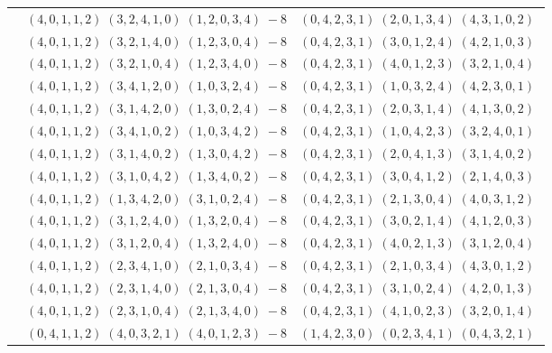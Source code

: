 \documentclass[11pt]{article}
\begin{document}
\begin{longtable}[l]{|c|c|c|}
 \cline{2-3} 
 & $(4 ,0 ,1 ,1 ,2) \;(3 ,2 ,4 ,1 ,0) \;(1 ,2 ,0 ,3 ,4) \;-8$ & $(0 ,4 ,2 ,3 ,1) \;(2 ,0 ,1 ,3 ,4) \;(4 ,3 ,1 ,0 ,2) \;$\\ 
 \cline{2-3} 
 & $(4 ,0 ,1 ,1 ,2) \;(3 ,2 ,1 ,4 ,0) \;(1 ,2 ,3 ,0 ,4) \;-8$ & $(0 ,4 ,2 ,3 ,1) \;(3 ,0 ,1 ,2 ,4) \;(4 ,2 ,1 ,0 ,3) \;$\\ 
 \cline{2-3} 
 & $(4 ,0 ,1 ,1 ,2) \;(3 ,2 ,1 ,0 ,4) \;(1 ,2 ,3 ,4 ,0) \;-8$ & $(0 ,4 ,2 ,3 ,1) \;(4 ,0 ,1 ,2 ,3) \;(3 ,2 ,1 ,0 ,4) \;$\\ 
 \cline{2-3} 
 & $(4 ,0 ,1 ,1 ,2) \;(3 ,4 ,1 ,2 ,0) \;(1 ,0 ,3 ,2 ,4) \;-8$ & $(0 ,4 ,2 ,3 ,1) \;(1 ,0 ,3 ,2 ,4) \;(4 ,2 ,3 ,0 ,1) \;$\\ 
 \cline{2-3} 
 & $(4 ,0 ,1 ,1 ,2) \;(3 ,1 ,4 ,2 ,0) \;(1 ,3 ,0 ,2 ,4) \;-8$ & $(0 ,4 ,2 ,3 ,1) \;(2 ,0 ,3 ,1 ,4) \;(4 ,1 ,3 ,0 ,2) \;$\\ 
 \cline{2-3} 
 & $(4 ,0 ,1 ,1 ,2) \;(3 ,4 ,1 ,0 ,2) \;(1 ,0 ,3 ,4 ,2) \;-8$ & $(0 ,4 ,2 ,3 ,1) \;(1 ,0 ,4 ,2 ,3) \;(3 ,2 ,4 ,0 ,1) \;$\\ 
 \cline{2-3} 
 & $(4 ,0 ,1 ,1 ,2) \;(3 ,1 ,4 ,0 ,2) \;(1 ,3 ,0 ,4 ,2) \;-8$ & $(0 ,4 ,2 ,3 ,1) \;(2 ,0 ,4 ,1 ,3) \;(3 ,1 ,4 ,0 ,2) \;$\\ 
 \cline{2-3} 
 & $(4 ,0 ,1 ,1 ,2) \;(3 ,1 ,0 ,4 ,2) \;(1 ,3 ,4 ,0 ,2) \;-8$ & $(0 ,4 ,2 ,3 ,1) \;(3 ,0 ,4 ,1 ,2) \;(2 ,1 ,4 ,0 ,3) \;$\\ 
 \cline{2-3} 
 & $(4 ,0 ,1 ,1 ,2) \;(1 ,3 ,4 ,2 ,0) \;(3 ,1 ,0 ,2 ,4) \;-8$ & $(0 ,4 ,2 ,3 ,1) \;(2 ,1 ,3 ,0 ,4) \;(4 ,0 ,3 ,1 ,2) \;$\\ 
 \cline{2-3} 
 & $(4 ,0 ,1 ,1 ,2) \;(3 ,1 ,2 ,4 ,0) \;(1 ,3 ,2 ,0 ,4) \;-8$ & $(0 ,4 ,2 ,3 ,1) \;(3 ,0 ,2 ,1 ,4) \;(4 ,1 ,2 ,0 ,3) \;$\\ 
 \cline{2-3} 
 & $(4 ,0 ,1 ,1 ,2) \;(3 ,1 ,2 ,0 ,4) \;(1 ,3 ,2 ,4 ,0) \;-8$ & $(0 ,4 ,2 ,3 ,1) \;(4 ,0 ,2 ,1 ,3) \;(3 ,1 ,2 ,0 ,4) \;$\\ 
 \cline{2-3} 
 & $(4 ,0 ,1 ,1 ,2) \;(2 ,3 ,4 ,1 ,0) \;(2 ,1 ,0 ,3 ,4) \;-8$ & $(0 ,4 ,2 ,3 ,1) \;(2 ,1 ,0 ,3 ,4) \;(4 ,3 ,0 ,1 ,2) \;$\\ 
 \cline{2-3} 
 & $(4 ,0 ,1 ,1 ,2) \;(2 ,3 ,1 ,4 ,0) \;(2 ,1 ,3 ,0 ,4) \;-8$ & $(0 ,4 ,2 ,3 ,1) \;(3 ,1 ,0 ,2 ,4) \;(4 ,2 ,0 ,1 ,3) \;$\\ 
 \cline{2-3} 
 & $(4 ,0 ,1 ,1 ,2) \;(2 ,3 ,1 ,0 ,4) \;(2 ,1 ,3 ,4 ,0) \;-8$ & $(0 ,4 ,2 ,3 ,1) \;(4 ,1 ,0 ,2 ,3) \;(3 ,2 ,0 ,1 ,4) \;$\\ 
 \cline{2-3} 
 & $(0 ,4 ,1 ,1 ,2) \;(4 ,0 ,3 ,2 ,1) \;(4 ,0 ,1 ,2 ,3) \;-8$ & $(1 ,4 ,2 ,3 ,0) \;(0 ,2 ,3 ,4 ,1) \;(0 ,4 ,3 ,2 ,1) \;$\\ 

\end{longtable}
\end{document}
